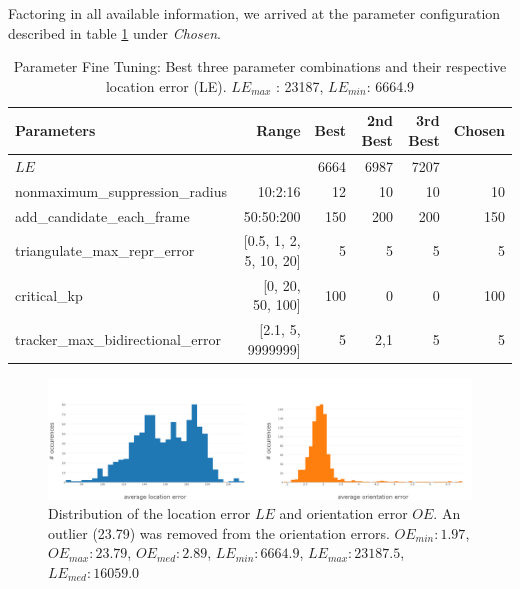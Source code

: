 \medskip

Factoring in all available information, we arrived at the parameter configuration described in table \ref{table:significant-param-tuning} under \emph{Chosen}.

\begin{table}[htp]
	\centering
	\caption{Parameter Fine Tuning: Best three parameter combinations and their respective location error (LE). $LE_{max}$ : 23187, $LE_{min}$: 6664.9}
	\label{table:significant-param-tuning}
	\begin{tabular}{lrrrrr}
		\hline
		\textbf{Parameters}                &         \textbf{Range} & \textbf{Best} & \textbf{2nd Best} & \textbf{3rd Best} & \textbf{Chosen} \\ \hline
		$LE$                &                        &          6664 &              6987 &              7207 &  \\ \hline\hline
		nonmaximum\_suppression\_radius     &                10:2:16 &            12 &                10 &                10 & 10\\ \hline
		add\_candidate\_each\_frame        &              50:50:200 &           150 &               200 &               200 & 150\\ \hline
		triangulate\_max\_repr\_error      & [0.5, 1, 2, 5, 10, 20] &             5 &                 5 &                 5 & 5\\ \hline
		critical\_kp                       &       [0, 20, 50, 100] &           100 &                 0 &                 0 & 100\\ \hline
		tracker\_max\_bidirectional\_error &      [2.1, 5, 9999999] &             5 &               2,1 &                 5 & 5\\ \hline
	\end{tabular}
\end{table}

\begin{figure}[htp]
	\centering
	\includegraphics[width=1\textwidth]{figures/error_histogram}
	\caption{Distribution of the location error $LE$ and orientation error $OE$. 
	An outlier (23.79) was removed from the orientation errors. 
		$OE_{min}: 1.97$, 
		$OE_{max}: 23.79$,
		$OE_{med}: 2.89$,
		$LE_{min}: 6664.9$,
		$LE_{max}: 23187.5$,
		$LE_{med}: 16059.0$}
	\label{fig:error_histogram}
\end{figure}

